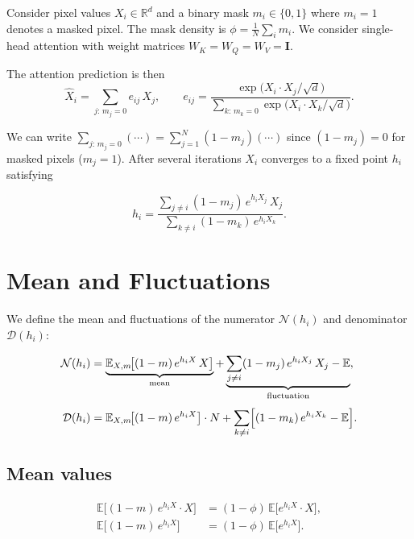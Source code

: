 \documentclass[aps,prb,onecolumn,showpacs,preprintnumbers,amsmath,amssymb]{revtex4-2}
\begin{document}
Consider pixel values $X_i \in \mathbb{R}^d$ and a binary mask
$m_i \in \{0,1\}$ where $m_i = 1$ denotes a masked pixel. The mask density is
$\phi = \frac{1}{N}\sum_i m_i$. We consider single-head attention with weight
matrices $W_K = W_Q = W_V = \mathbf{I}$.

The attention prediction is then
\begin{equation}
    \hat{X}_i = \sum_{j:\,m_j=0} e_{ij}\,X_j,
    \qquad
    e_{ij} = \frac{\exp\!\bigl(X_i \cdot X_j/\sqrt{d}\bigr)}
                  {\displaystyle\sum_{k:\,m_k=0}\exp\!\bigl(X_i \cdot X_k/\sqrt{d}\bigr)}.
\end{equation}

We can write $\sum_{j:\,m_j=0}(\cdots) = \sum_{j=1}^{N}(1-m_j)(\cdots)$ since
$(1-m_j)=0$ for masked pixels ($m_j=1$). After several iterations $X_i$ converges
to a fixed point $h_i$ satisfying

\begin{equation}\label{eq:FP}
    h_i = \frac{\displaystyle\sum_{j\neq i}(1-m_j)\,e^{h_i X_j}\,X_j}
               {\displaystyle\sum_{k\neq i}(1-m_k)\,e^{h_i X_k}}.
    \tag{F.P.}
\end{equation}

\section{Mean and Fluctuations}

We define the mean and fluctuations of the numerator $\mathcal{N}(h_i)$ and
denominator $\mathcal{D}(h_i)$:

\begin{align}
    \mathcal{N}(h_i) &= \underbrace{\mathbb{E}_{X,m}\!\bigl[(1-m)\,e^{h_i X}\,X\bigr]}_{\text{mean}}
                      + \underbrace{\sum_{j\neq i}(1-m_j)\,e^{h_i X_j}\,X_j - \mathbb{E}}_{\text{fluctuation}}, \\[4pt]
    \mathcal{D}(h_i) &= \mathbb{E}_{X,m}\!\bigl[(1-m)\,e^{h_i X}\bigr]\cdot N
                      + \sum_{k\neq i}\Bigl[(1-m_k)\,e^{h_i X_k} - \mathbb{E}\Bigr].
\end{align}

\subsection{Mean values}

\begin{align}
    \mathbb{E}\!\bigl[(1-m)\,e^{h_i X}\cdot X\bigr] &= (1-\phi)\,\mathbb{E}\!\bigl[e^{h_i X}\cdot X\bigr], \\
    \mathbb{E}\!\bigl[(1-m)\,e^{h_i X}\bigr]         &= (1-\phi)\,\mathbb{E}\!\bigl[e^{h_i X}\bigr].
\end{align}
\end{document}
